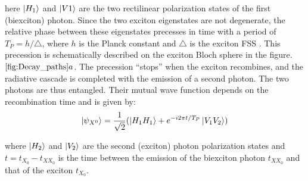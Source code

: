 	here $\ket{H_1}$ and $\ket{V1}$ are the two rectilinear polarization states of the first (biexciton) photon. Since the two exciton eigenstates are not degenerate, the relative phase between these eigenstates precesses in time with a period of $T_P = h/\triangle$, where $h$ is the Planck constant and $\triangle$ is the exciton FSS \cite{rwinik2017}.
	This precession is schematically described on the exciton Bloch sphere in the figure. $\ref{fig:Decay_paths}a$.
	The precession “stops” when the exciton recombines, and the radiative cascade is completed with the emission of a second photon. The two photons are thus entangled. Their mutual wave function depends on the recombination time and is given by:
	\begin{equation}
		\ket{\psi_{X^0}} = \frac{1}{\sqrt{2}}(\ket{H_1H_1} +e^{-i2\pi t/T_P}\ket{V_1V_2})
	\end{equation}
 
	where $\ket{H_2}$ and $\ket{V_2}$ are the second (exciton) photon polarization states and $t = t_{X_0} - t_{{XX}_0}$ is the time between the emission of the biexciton photon $t_{{XX}_0}$ and that of the exciton $t_{X_0}$.
